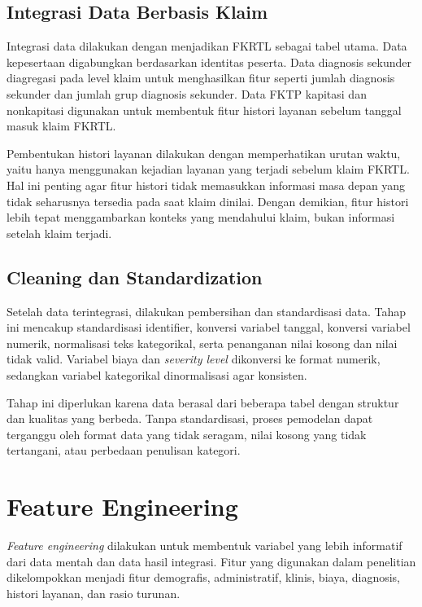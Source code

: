 \subsection{Integrasi Data Berbasis Klaim}\label{integrasi-data-berbasis-klaim}

Integrasi data dilakukan dengan menjadikan FKRTL sebagai tabel utama. Data kepesertaan digabungkan berdasarkan identitas peserta. Data diagnosis sekunder diagregasi pada level klaim untuk menghasilkan fitur seperti jumlah diagnosis sekunder dan jumlah grup diagnosis sekunder. Data FKTP kapitasi dan nonkapitasi digunakan untuk membentuk fitur histori layanan sebelum tanggal masuk klaim FKRTL.

Pembentukan histori layanan dilakukan dengan memperhatikan urutan waktu, yaitu hanya menggunakan kejadian layanan yang terjadi sebelum klaim FKRTL. Hal ini penting agar fitur histori tidak memasukkan informasi masa depan yang tidak seharusnya tersedia pada saat klaim dinilai. Dengan demikian, fitur histori lebih tepat menggambarkan konteks yang mendahului klaim, bukan informasi setelah klaim terjadi.

\subsection{Cleaning dan Standardization}\label{cleaning-dan-standardization}

Setelah data terintegrasi, dilakukan pembersihan dan standardisasi data. Tahap ini mencakup standardisasi identifier, konversi variabel tanggal, konversi variabel numerik, normalisasi teks kategorikal, serta penanganan nilai kosong dan nilai tidak valid. Variabel biaya dan \emph{severity level} dikonversi ke format numerik, sedangkan variabel kategorikal dinormalisasi agar konsisten.

Tahap ini diperlukan karena data berasal dari beberapa tabel dengan struktur dan kualitas yang berbeda. Tanpa standardisasi, proses pemodelan dapat terganggu oleh format data yang tidak seragam, nilai kosong yang tidak tertangani, atau perbedaan penulisan kategori.

\section{Feature Engineering}\label{feature-engineering}

\emph{Feature engineering} dilakukan untuk membentuk variabel yang lebih informatif dari data mentah dan data hasil integrasi. Fitur yang digunakan dalam penelitian dikelompokkan menjadi fitur demografis, administratif, klinis, biaya, diagnosis, histori layanan, dan rasio turunan.

